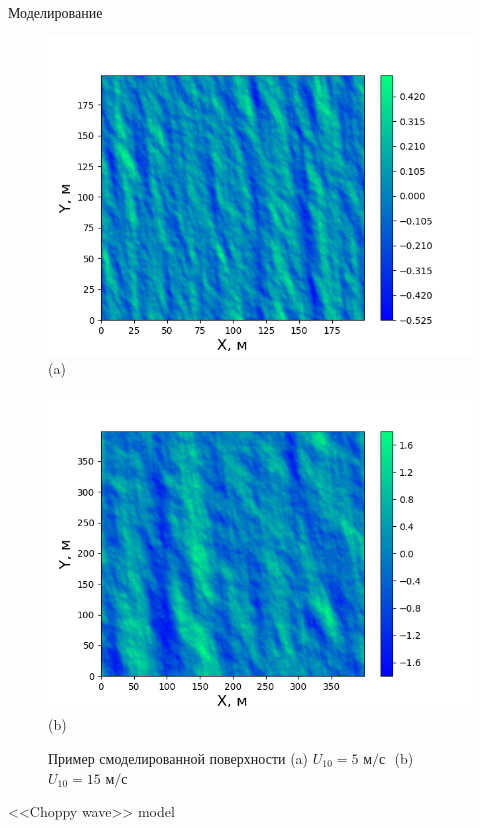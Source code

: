 \begin{frame}[t]{}
\begin{columns}[t]
\begin{column}{.48\linewidth}
\begin{block}{Моделирование}
\begin{figure}[h]
\begin{minipage}{0.45\linewidth}
                \includegraphics[width=\linewidth]{water5}
                \centering
                (a)
            \end{minipage}
            \begin{minipage}{0.45\linewidth}
                \includegraphics[width=\linewidth]{water15}
                \centering
                (b)
            \end{minipage}
            \caption{Пример смоделированной поверхности (a) $U_{10} = 5 \text{ м/с }$ (b) $U_{10} = 15 \text{ м/с}$}
        \end{figure}
        \end{block}
        \begin{block}{<<Choppy wave>> model}

\end{block}
\end{column}
\end{columns}
\end{frame}
